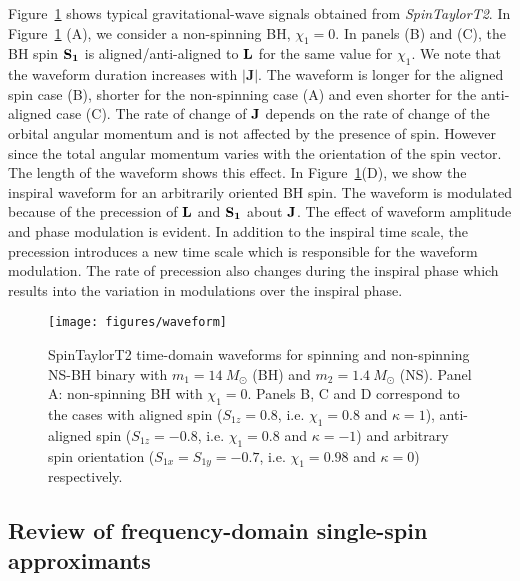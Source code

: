 \documentclass[preprint,onecolumn,,tightenlines,superscriptaddress,showpacs,nofootinbib,eqsecnum,amsfonts,amsmath]{revtex4}
\begin{document}
Figure~\ref{fig:SPT2_waveform} shows typical gravitational-wave signals obtained
from \textit{SpinTaylorT2}. In Figure~\ref{fig:SPT2_waveform} (A), we consider a
non-spinning BH, $\chi_1=0$. In panels (B) and (C), the BH spin $\bf S_1$ is
aligned/anti-aligned to $\bf L$ for the same value for $\chi_1$. We note that
the waveform duration increases with $|\mathbf{J}|$.  The waveform is longer for
the aligned spin case (B), shorter for the non-spinning case (A) and even
shorter for the anti-aligned case (C). The rate of change of $\bf J$ depends on
the rate of change of the orbital angular momentum and is not affected by the
presence of spin. However since the total angular momentum varies with the
orientation of the spin vector. The length of the waveform shows this effect.
In Figure~\ref{fig:SPT2_waveform}(D), we show the inspiral waveform for an
arbitrarily oriented BH spin. The waveform is modulated because of the
precession of $\bf L$ and $\bf S_1$ about $\bf J$. The effect of waveform
amplitude and phase modulation is evident. In addition to the inspiral time
scale, the precession introduces a new time scale which is responsible for the
waveform modulation. The rate of precession also changes during the inspiral
phase which results into the variation in modulations over the inspiral phase.

\begin{figure}
 \centering
 \texttt{[image: figures/waveform]}
  \caption{SpinTaylorT2 time-domain waveforms for spinning and non-spinning NS-BH binary with 
 $m_1=14~M_{\odot}$ (BH) and $m_2=1.4~M_{\odot}$ (NS). Panel A: non-spinning BH with $\chi_1=0$. 
Panels B, C and D correspond to the cases with aligned spin ($S_{1z}=0.8$, i.e. $\chi_1=0.8$ and $\kappa=1$), 
anti-aligned spin ($S_{1z}=-0.8$, i.e. $\chi_1=0.8$ and $\kappa=-1$) 
and arbitrary spin orientation ($S_{1x}=S_{1y}=-0.7$, i.e. $\chi_1= 0.98$ and $\kappa=0$) respectively.}
\label{fig:SPT2_waveform}
\end{figure}
\subsection{Review of frequency-domain single-spin approximants}
\label{IIb}
\end{document}
